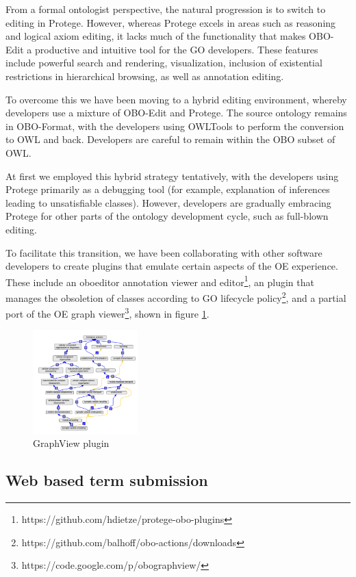 \documentclass{llncs}
\begin{document}
From a formal ontologist perspective, the natural progression is to
switch to editing in Protege. However, whereas Protege excels in areas
such as reasoning and logical axiom editing, it lacks much of the
functionality that makes OBO-Edit a productive and intuitive tool for
the GO developers. These features include powerful search and
rendering, visualization, inclusion of existential restrictions in
hierarchical browsing, as well as annotation editing.

To overcome this we have been moving to a hybrid editing environment,
whereby developers use a mixture of OBO-Edit and Protege. The source
ontology remains in OBO-Format, with the developers using
OWLTools\cite{OWLTools} to perform the conversion to OWL and
back. Developers are careful to remain within the OBO subset of OWL.

At first we employed this hybrid strategy tentatively, with the
developers using Protege primarily as a debugging tool (for example,
explanation of inferences leading to unsatisfiable classes). However,
developers are gradually embracing Protege for other parts of the
ontology development cycle, such as full-blown editing.

To facilitate this transition, we have been collaborating with other
software developers to create plugins that emulate certain aspects of
the OE experience. These include an oboeditor annotation viewer and
editor\footnote{https://github.com/hdietze/protege-obo-plugins}, an
plugin that manages the obsoletion of classes according to GO
lifecycle policy\footnote{https://github.com/balhoff/obo-actions/downloads}, and a partial
port of the OE graph
viewer\footnote{https://code.google.com/p/obographview/}, shown in figure
\ref{gv}.

\begin{figure}
\label{gv}
\center
\includegraphics[height=4cm]{gv-plugin}
\caption{GraphView plugin}
\end{figure}

\subsection{Web based term submission}
\end{document}
